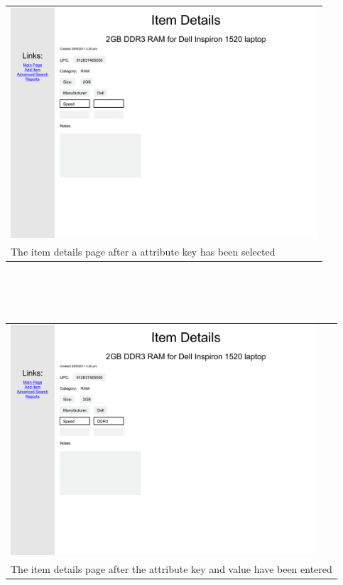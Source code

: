 \documentclass{article}
\begin{document}
\begin{tabular}{ p{4.5in} }
\includegraphics[keepaspectratio, width=4.5in]{modifyDetailsF0S2.pdf} \\
The item details page after a attribute key has been selected
\end{tabular}\\
~\\
~\\
\begin{tabular}{ p{4.5in} }
\includegraphics[keepaspectratio, width=4.5in]{modifyDetailsF0S3.pdf} \\
The item details page after the attribute key and value have been entered
\end{tabular}\\
~\\
~\\
\end{document}
